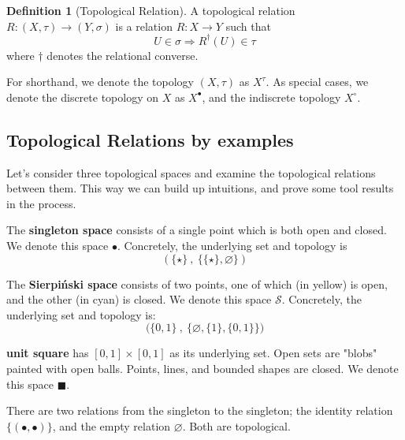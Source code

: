 \documentclass{tufte-handout}
\theoremstyle{definition}
\newtheorem{defn}[theorem]{Definition}
\newtheorem{rem}[theorem]{Reminder}
\begin{document}
\begin{defn}[Topological Relation]\label{defn:toprelation}
A topological relation $R: (X,\tau) \rightarrow (Y,\sigma)$ is a relation $R: X \rightarrow Y$ such that \[U \in \sigma \Rightarrow R^{\dag}(U) \in \tau\] where $\dag$ denotes the relational converse.
\end{defn}

For shorthand, we denote the topology $(X,\tau)$ as $X^{\tau}$. As special cases, we denote the discrete topology on $X$ as $X^{\bullet}$, and the indiscrete topology $X^{\circ}$.

\newpage

\begin{fullwidth}

\section{Topological Relations by examples}

Let's consider three topological spaces and examine the topological relations between them. This way we can build up intuitions, and prove some tool results in the process.

The \textbf{singleton space} consists of a single point which is both open and closed. We denote this space $\bullet$. Concretely, the underlying set and topology is
\[(\{\star\} \ , \ \{\{\star\},\varnothing\})\] 

The \textbf{Sierpi\'{n}ski space} consists of two points, one of which (in yellow) is open, and the other (in cyan) is closed. We denote this space $\mathcal{S}$. Concretely, the underlying set and topology is:
\[\big( \{0,1\} \ , \ \{ \varnothing, \{ 1 \} , \{ 0,1\} \} \big)\]

\textbf{unit square} has $[0,1] \times [0,1]$ as its underlying set.  Open sets are "blobs" painted with open balls. Points, lines, and bounded shapes are closed. We denote this space $\blacksquare$.
\end{fullwidth}

\newthought{$\bullet \rightarrow \bullet$:} There are two relations from the singleton to the singleton; the identity relation $\{ (\bullet,\bullet) \}$, and the empty relation $\varnothing$. Both are topological.
\end{document}

